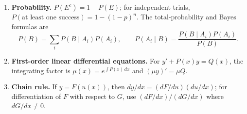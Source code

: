 \begin{enumerate}[label=\textbf{1.1.\arabic*.},ref=1.1.\arabic*]
\begin{equation*}
\end{equation*}
\item \label{formula-1-1-8} \textbf{Probability.} $P(E^c)=1-P(E)$; for independent trials, $P(\text{at least one success})=1-(1-p)^n$. The total-probability and Bayes formulas are
\begin{equation*}\tag{1.1.8.1}
P(B)=\sum_iP(B\mid A_i)P(A_i),\qquad
P(A_i\mid B)=\frac{P(B\mid A_i)P(A_i)}{P(B)}.
\end{equation*}
\item \label{formula-1-1-9} \textbf{First-order linear differential equations.} For $y'+P(x)y=Q(x)$, the integrating factor is $\mu(x)=e^{\int P(x)\,dx}$ and $(\mu y)'=\mu Q$.
\item \label{formula-1-1-10} \textbf{Chain rule.} If $y=F(u(x))$, then $dy/dx=(dF/du)(du/dx)$; for differentiation of $F$ with respect to $G$, use $(dF/dx)/(dG/dx)$ where $dG/dx\ne0$.
\end{enumerate}
